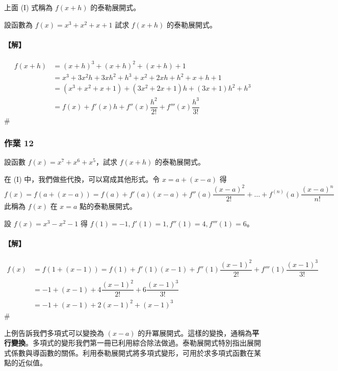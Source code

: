 上面 (I) 式稱為 $f(x+h)$ 的泰勒展開式。

\begin{example}\label{ex:b6-2-19}
設函數為 $f(x)=x^3+x^2+x+1$ 試求 $f(x+h)$ 的泰勒展開式。
\end{example}

\paragraph{【解】}
\begin{align*}
f(x+h) &= (x+h)^3 + (x+h)^2 + (x+h) + 1 \\
&= x^3+3x^2h+3xh^2+h^3 + x^2+2xh+h^2 + x+h + 1 \\
&= (x^3+x^2+x+1) + (3x^2+2x+1)h + (3x+1)h^2 + h^3 \\
&= f(x) + f'(x)h + f''(x)\dfrac{h^2}{2!} + f'''(x)\dfrac{h^3}{3!}
\end{align*}
\hfill$\#$

\subsubsection*{作業 12}\label{hw:b6-2-12}
設函數 $f(x)=x^7+x^6+x^5$，試求 $f(x+h)$ 的泰勒展開式。

在 (I) 中，我們做些代換，可以寫成其他形式。令 $x=a+(x-a)$ 得
\begin{equation}
f(x) = f(a+(x-a)) = f(a) + f'(a)(x-a) + f''(a)\dfrac{(x-a)^2}{2!} + \dots + f^{(n)}(a)\dfrac{(x-a)^n}{n!} \tag{II} \label{eq:b6-2-4-taylor-II}
\end{equation}
此稱為 $f(x)$ 在 $x=a$ 點的泰勒展開式。

\begin{example}\label{ex:b6-2-20}
設 $f(x)=x^3-x^2-1$ 得 $f(1)=-1, f'(1)=1, f''(1)=4, f'''(1)=6$。
\end{example}

\paragraph{【解】}
\begin{align*}
f(x) &= f(1+(x-1)) = f(1) + f'(1)(x-1) + f''(1)\dfrac{(x-1)^2}{2!} + f'''(1)\dfrac{(x-1)^3}{3!} \\
&= -1 + (x-1) + 4\dfrac{(x-1)^2}{2!} + 6\dfrac{(x-1)^3}{3!} \\
&= -1 + (x-1) + 2(x-1)^2 + (x-1)^3
\end{align*}
\hfill$\#$

上例告訴我們多項式可以變換為 $(x-a)$ 的升冪展開式。這樣的變換，通稱為\textbf{平行變換}。多項式的變形我們第一冊已利用綜合除法做過。泰勒展開式特別指出展開式係數與導函數的關係。利用泰勒展開式將多項式變形，可用於求多項式函數在某點的近似值。

